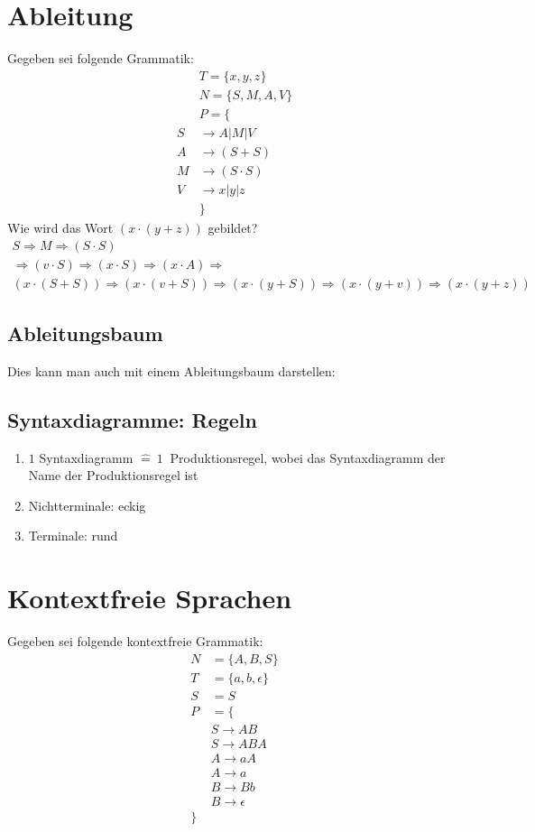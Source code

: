 \section{Ableitung}
Gegeben sei folgende Grammatik:
\begin{align*}
    &T=\{x,y,z\}\\
    &N=\{S, M, A, V\}\\
    &P=\{\\
    S&\rightarrow A|M|V\\
    A&\rightarrow (S+S)\\
    M&\rightarrow (S\cdot S)\\
    V&\rightarrow x|y|z\\
    &\}
\end{align*}
Wie wird das Wort $(x\cdot (y+z))$ gebildet?
\begin{align*}
    S\Rightarrow M\Rightarrow (S\cdot S)\\
    \Rightarrow (v\cdot S)\Rightarrow (x\cdot S)\Rightarrow (x\cdot A)\Rightarrow\\ (x\cdot (S+S))\Rightarrow (x\cdot (v + S))\Rightarrow (x\cdot (y + S))\Rightarrow (x\cdot (y + v))\Rightarrow (x\cdot (y + z))
\end{align*}
\subsection{Ableitungsbaum}
Dies kann man auch mit einem Ableitungsbaum darstellen:
\subsection{Syntaxdiagramme: Regeln}
\begin{enumerate}
    \item $1$ Syntaxdiagramm $\hat{=}\ 1\ $ Produktionsregel, wobei das Syntaxdiagramm der Name der Produktionsregel ist
    \item Nichtterminale: eckig
    \item Terminale: rund
\end{enumerate}

\section{Kontextfreie Sprachen}
Gegeben sei folgende kontextfreie Grammatik:
\begin{align*}
    N&=\{A,B,S\}\\
    T&=\{a,b,\epsilon\}\\
    S&=S\\
    P&=\{\\
        &S\to AB\\
        &S\to ABA\\
        &A\to aA\\
        &A\to a\\
        &B\to Bb\\
        &B\to \epsilon\\
        \}
    \end{align*}
